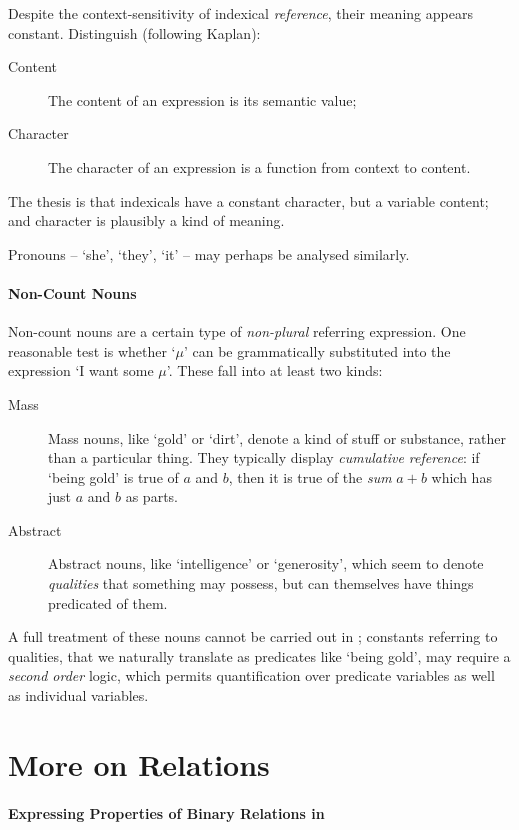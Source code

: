 Despite the context-sensitivity of indexical \emph{reference}, their meaning appears constant. Distinguish (following Kaplan):  \begin{description}
	\item [Content] The content of an expression is its semantic value;
	\item [Character] The character of an expression is a function from context to content.
\end{description} The thesis is that indexicals have a constant character, but a variable content; and character is plausibly a kind of meaning.

Pronouns – `she', `they', `it' – may perhaps be analysed similarly.




\paragraph{Non-Count Nouns}
Non-count nouns are a certain type of \emph{non-plural} referring expression. One reasonable test is whether `$\mu$'  can be grammatically substituted into the expression `I want some $\mu$'. 
 These fall into at least two kinds: \begin{description}
	\item [Mass] Mass nouns, like `gold' or `dirt', denote a kind of stuff or substance, rather than a particular thing. They typically display \emph{cumulative reference}: if `being gold' is true of $a$ and $b$, then it is true of the \emph{sum} $a+b$ which has just $a$ and $b$ as parts.
	\item [Abstract] Abstract nouns, like `intelligence' or `generosity', which seem to denote \emph{qualities} that something may possess, but can themselves have things predicated of them.  
\end{description}
A full treatment of these nouns cannot be carried out in \ltwo; constants referring to qualities, that we naturally translate as predicates like `being gold', may require a \emph{second order} logic, which permits quantification over predicate variables as well as individual variables. 







\section{More on Relations}
 
 \paragraph{Expressing Properties of Binary Relations in \ltwo}
 
